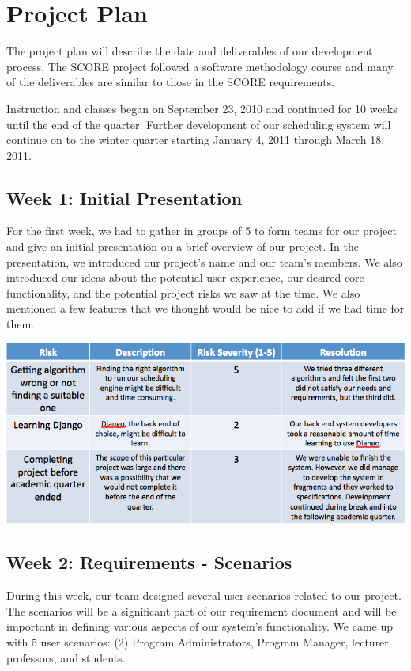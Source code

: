 \documentclass[12pt]{article}
\begin{document}
\section{Project Plan} %

The project plan will describe the date and deliverables of our development process. The SCORE project followed a software methodology course and many of the deliverables are similar to those in the SCORE requirements. 

Instruction and classes began on September 23, 2010 and continued for 10 weeks until the end of the quarter. Further development of our scheduling system will continue on to the winter quarter starting January 4, 2011 through March 18, 2011. 

\subsection*{Week 1: Initial Presentation}

For the first week, we had to gather in groups of 5 to form teams for our project and give an initial presentation on a brief overview of our project. In the presentation, we introduced our project's name and our team's members. We also introduced our ideas about the potential user experience, our desired core functionality, and the potential project risks we saw at the time. We also mentioned a few features that we thought would be nice to add if we had time for them.

\includegraphics[scale=0.45]{risktable.png}

\subsection*{Week 2: Requirements - Scenarios}

During this week, our team designed several user scenarios related to our project. The scenarios will be a significant part of our requirement document and will be important in defining various aspects of our system's functionality. We came up with 5 user scenarios:  (2) Program Administrators, Program Manager, lecturer professors, and students. 
\end{document}

